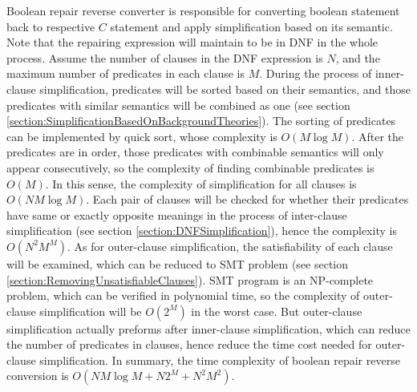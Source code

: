 Boolean repair reverse converter is responsible for converting boolean statement back to respective $C$ statement and apply simplification based on its semantic.
Note that the repairing expression will maintain to be in DNF in the whole process.
Assume the number of clauses in the DNF expression is $N$, and the maximum number of predicates in each clause is $M$.
During the process of inner-clause simplification, predicates will be sorted based on their semantics, and those predicates with similar semantics will be combined as one (see section \ref{section:SimplificationBasedOnBackgroundTheories}).
The sorting of predicates can be implemented by quick sort, whose complexity is $O(M\log{M})$. After the predicates are in order, those predicates with combinable semantics will only appear consecutively,
so the complexity of finding combinable predicates is $O(M)$.
In this sense, the complexity of simplification for all clauses is $O(NM\log{M})$.
Each pair of clauses will be checked for whether their predicates have same or exactly opposite meanings in the process of inter-clause simplification (see section \ref{section:DNFSimplification}), hence the complexity is $O(N^{2}M^{M})$.
As for outer-clause simplification, the satisfiability of each clause will be examined, which can be reduced to SMT problem (see section \ref{section:RemovingUnsatisfiableClauses}).
SMT program is an NP-complete problem, which can be verified in polynomial time, so the complexity of outer-clause simplification will be $O(2^{M})$ in the worst case.
But outer-clause simplification actually preforms after inner-clause simplification, which can reduce the number of predicates in clauses, hence reduce the time cost needed for outer-clause simplification.
In summary, the time complexity of boolean repair reverse conversion is $O(NM\log{M} + N2^{M} + N^{2}M^{2})$.
